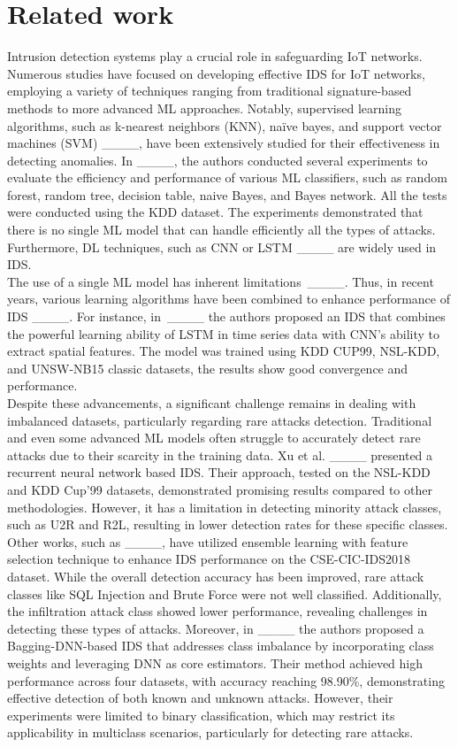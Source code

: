 \section{Related work}
Intrusion detection systems play a crucial role in safeguarding \gls{IoT} networks. Numerous studies have focused on developing effective \gls{IDS} for \gls{IoT} networks, employing a variety of techniques ranging from traditional signature-based methods to more advanced \gls{ML} approaches. Notably, supervised learning algorithms, such as k-nearest neighbors (KNN), naïve bayes, and support vector machines (SVM) ____, have been extensively studied for their effectiveness in detecting anomalies. In ____, the authors conducted  several experiments to evaluate the efficiency and performance of various \gls{ML} classifiers, such as random forest, random tree, decision table, naive Bayes, and Bayes network. All the tests were conducted using the KDD dataset. The experiments demonstrated that there is no single \gls{ML} model that can handle efficiently all the types of attacks.
Furthermore, \gls{DL} techniques, such as \gls{CNN} or \gls{LSTM} ____ are widely used in \gls{IDS}.\\
\indent The use of a single \gls{ML} model has inherent \mbox{limitations ____.} Thus, in recent years, various learning algorithms have been combined to enhance performance of \gls{IDS} ____. For instance, \mbox{in ____} the authors proposed an \gls{IDS} that combines the powerful learning ability of LSTM in time series data with \gls{CNN}'s ability to extract spatial features. The model was trained using KDD CUP99, NSL-KDD, and UNSW-NB15 classic datasets, the results show good convergence and performance.\\
\indent Despite these advancements, a significant challenge remains in dealing with imbalanced datasets, particularly regarding rare attacks detection. Traditional and even some advanced \gls{ML} models often struggle to accurately detect rare attacks due to their scarcity in the training data. Xu et al. ____ presented a recurrent neural network based \gls{IDS}. Their approach, tested on the NSL-KDD and KDD Cup'99 datasets, demonstrated promising results compared to other methodologies. However, it has a limitation in detecting minority attack classes, such as U2R and R2L, resulting in lower detection rates for these specific classes. Other works, such as ____, have utilized ensemble learning with feature selection technique to enhance IDS performance on the CSE-CIC-IDS2018 dataset. While the overall detection accuracy has been improved, rare attack classes like SQL Injection and Brute Force were not well classified. Additionally, the infiltration attack class showed lower performance, revealing challenges in detecting these types of attacks. Moreover, in ____  the authors proposed a Bagging-DNN-based \gls{IDS} that addresses class imbalance by incorporating class weights and leveraging \gls{DNN} as core estimators. Their method achieved high performance across four datasets, with accuracy reaching 98.90\%, demonstrating effective detection of both known and unknown attacks. However, their experiments were limited to binary classification, which may restrict its applicability in multiclass scenarios, particularly for detecting rare attacks.

